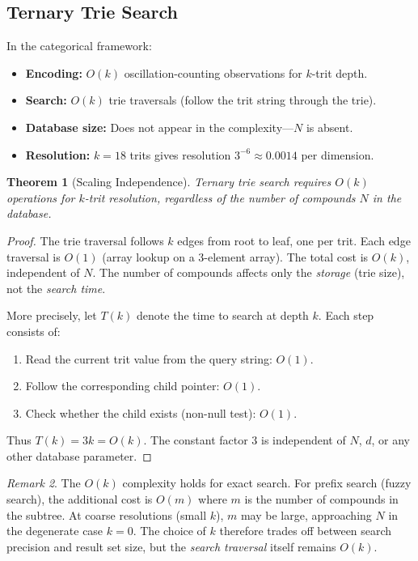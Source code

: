 \documentclass[11pt,twocolumn,a4paper]{article}
\newtheorem{theorem}{Theorem}[section]
\theoremstyle{definition}
\theoremstyle{remark}
\newtheorem{remark}[theorem]{Remark}
\begin{document}
\subsection{Ternary Trie Search}

In the categorical framework:

\begin{itemize}[nosep]
\item \textbf{Encoding:} $O(k)$ oscillation-counting observations for $k$-trit depth.
\item \textbf{Search:} $O(k)$ trie traversals (follow the trit string through the trie).
\item \textbf{Database size:} Does not appear in the complexity---$N$ is absent.
\item \textbf{Resolution:} $k = 18$ trits gives resolution $3^{-6} \approx 0.0014$ per dimension.
\end{itemize}

\begin{theorem}[Scaling Independence]
\label{thm:scaling}
Ternary trie search requires $O(k)$ operations for $k$-trit resolution, regardless of the number of compounds $N$ in the database.
\end{theorem}

\begin{proof}
The trie traversal follows $k$ edges from root to leaf, one per trit. Each edge traversal is $O(1)$ (array lookup on a 3-element array). The total cost is $O(k)$, independent of $N$. The number of compounds affects only the \emph{storage} (trie size), not the \emph{search time}.

More precisely, let $T(k)$ denote the time to search at depth $k$. Each step consists of:
\begin{enumerate}[nosep]
\item Read the current trit value from the query string: $O(1)$.
\item Follow the corresponding child pointer: $O(1)$.
\item Check whether the child exists (non-null test): $O(1)$.
\end{enumerate}
Thus $T(k) = 3k = O(k)$. The constant factor 3 is independent of $N$, $d$, or any other database parameter.
\end{proof}

\begin{remark}
The $O(k)$ complexity holds for exact search. For prefix search (fuzzy search), the additional cost is $O(m)$ where $m$ is the number of compounds in the subtree. At coarse resolutions (small $k$), $m$ may be large, approaching $N$ in the degenerate case $k = 0$. The choice of $k$ therefore trades off between search precision and result set size, but the \emph{search traversal} itself remains $O(k)$.
\end{remark}
\end{document}
